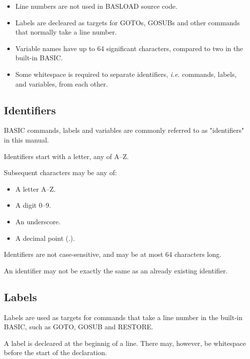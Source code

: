 \documentclass{article}
\begin{document}
        \begin{itemize}
            \item Line numbers are not used in BASLOAD source code.
            \item Labels are decleared as targets for GOTOs, GOSUBs and
                  other commands that normally take a line number.
            \item Variable names have up to 64 significant characters, compared to two
                  in the built-in BASIC.
            \item Some whitespace is required to separate identifiers, 
                  \textit{i.e.} commands, labels, and variables, from each other.
                  
        \end{itemize}
    
    \subsection{Identifiers}

        BASIC commands, labels and variables are commonly referred to as "identifiers" in this
        manual.

        Identifiers start with a letter, any of A--Z.

        Subsequent characters may be any of:

        \begin{itemize}
            \item A letter A--Z.
            \item A digit 0--9. 
            \item An underscore. 
            \item A decimal point (.).
        \end{itemize}

        Identifiers are not case-sensitive, and may be at most 64 characters long.

        An identifier may not be exactly the same as an already existing identifier.

    \subsection{Labels}

        Labels are used as targets for commands that take a line number in
        the built-in BASIC, such as GOTO, GOSUB and RESTORE.

        A label is decleared at the beginnig of a line. There may, however,
        be whitespace before the start of the declaration.
\end{document}
